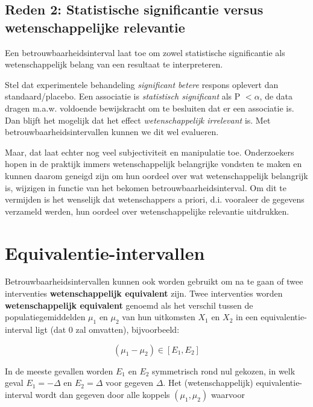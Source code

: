 \documentclass[
  12pt,dutch]{book}
\theoremstyle{definition}
\theoremstyle{definition}
\theoremstyle{definition}
\theoremstyle{definition}
\theoremstyle{remark}
\begin{document}
\subsection{Reden 2: Statistische significantie versus wetenschappelijke relevantie}\label{reden-2-statistische-significantie-versus-wetenschappelijke-relevantie}

Een betrouwbaarheidsinterval laat toe om zowel statistische significantie als wetenschappelijk belang van een resultaat te interpreteren.

Stel dat experimentele behandeling \emph{significant betere} respons oplevert dan standaard/placebo.
Een associatie is \emph{statistisch significant} als P \(< \alpha\),
de data dragen m.a.w. voldoende bewijskracht om te besluiten dat er een associatie is. Dan blijft het mogelijk dat het effect \emph{wetenschappelijk irrelevant} is.
Met betrouwbaarheidsintervallen kunnen we dit wel evalueren.

Maar, dat laat echter nog veel subjectiviteit en manipulatie toe. Onderzoekers hopen in de praktijk immers wetenschappelijk belangrijke vondsten te maken en kunnen daarom geneigd zijn om hun oordeel over wat wetenschappelijk belangrijk is, wijzigen in functie van het bekomen betrouwbaarheidsinterval. Om dit te vermijden is het wenselijk dat wetenschappers a priori, d.i. vooraleer de gegevens verzameld werden, hun oordeel over wetenschappelijke relevantie uitdrukken.

\section{Equivalentie-intervallen}\label{equivalentie-intervallen}

Betrouwbaarheidsintervallen kunnen ook worden gebruikt om na te gaan of twee interventies \textbf{wetenschappelijk equivalent} zijn.
Twee interventies worden \textbf{wetenschappelijk equivalent} genoemd als het verschil tussen de populatiegemiddelden
\(\mu_1\) en \(\mu_2\) van hun uitkomsten \(X_1\) en \(X_2\) in een
equivalentie-interval ligt (dat 0 zal omvatten), bijvoorbeeld:

\begin{equation*}
(\mu_1 - \mu_2) \in [E_1, E_2]
\end{equation*}

In de meeste gevallen worden \(E_1\) en \(E_2\) symmetrisch rond nul gekozen, in
welk geval \(E_1=-\Delta\) en \(E_2=\Delta\) voor gegeven \(\Delta\). Het
(wetenschappelijk) equivalentie-interval wordt dan gegeven door alle koppels \((\mu_1,\mu_2)\) waarvoor
\end{document}
